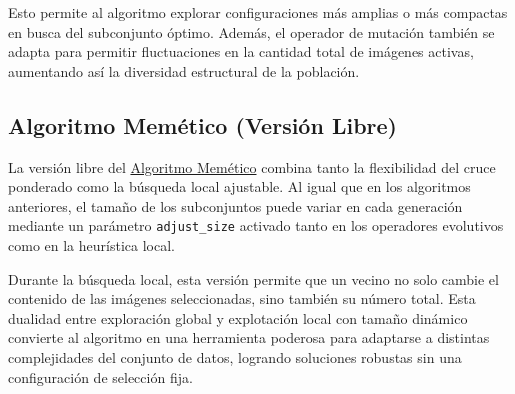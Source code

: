 Esto permite al algoritmo explorar configuraciones más amplias o más compactas en busca del subconjunto óptimo.
Además, el operador de mutación también se adapta para permitir fluctuaciones en la cantidad total de imágenes activas,
aumentando así la diversidad estructural de la población.

\subsection{Algoritmo Memético (Versión Libre)}\label{subsec:memetico-libre}

La versión libre del \hyperref[sec:algoritmo-memetico]{Algoritmo Memético} combina tanto la flexibilidad del cruce ponderado como la búsqueda local ajustable.
Al igual que en los algoritmos anteriores, el tamaño de los subconjuntos puede variar en cada generación mediante un parámetro \texttt{adjust\_size}
activado tanto en los operadores evolutivos como en la heurística local.

Durante la búsqueda local, esta versión permite que un vecino no solo cambie el contenido de las imágenes seleccionadas, sino también su número total.
Esta dualidad entre exploración global y explotación local con tamaño dinámico convierte al algoritmo en una herramienta poderosa para adaptarse a
distintas complejidades del conjunto de datos, logrando soluciones robustas sin una configuración de selección fija.
